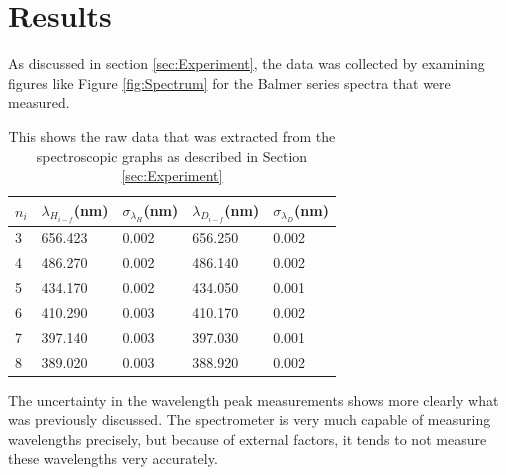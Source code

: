 \documentclass[%
 aps,%
 pra,%
 preprint, %
 amsmath, %
 amsfonts, %
 amssymb, %
]{revtex4-2}
\begin{document}
\section{\label{sec:Results} Results}
As discussed in section \ref{sec:Experiment}, the data was collected by examining figures like Figure \ref{fig:Spectrum} for the Balmer series spectra that were measured. 
\begin{table}[]
\begin{tabular}{l|l|l|l|l}
\hline 
\hline
$n_i$ & $\lambda_{H_{i-f}}$(nm) & $\sigma_{\lambda_H}$(nm) & $\lambda_{D_{i-f}}$(nm) & $\sigma_{\lambda_D}$(nm)\\
\hline
3     & 656.423               & 0.002                    & 656.250               & 0.002                    \\
4     & 486.270               & 0.002                    & 486.140               & 0.002                    \\
5     & 434.170               & 0.002                    & 434.050               & 0.001                    \\
6     & 410.290               & 0.003                    & 410.170               & 0.002                    \\
7     & 397.140               & 0.003                    & 397.030               & 0.001                    \\
8     & 389.020               & 0.003                    & 388.920               & 0.002 \\
\hline
\hline
\end{tabular}
\label{tab:Raw Data}
\caption{This shows the raw data that was extracted from the spectroscopic graphs as described in Section \ref{sec:Experiment}}
\end{table}
\newpage
The uncertainty in the wavelength peak measurements shows more clearly what was previously discussed. The spectrometer is very much capable of measuring wavelengths precisely, but because of external factors, it tends to not measure these wavelengths very accurately.  
\end{document}
